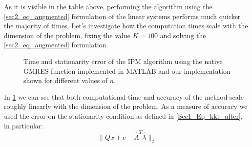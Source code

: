 As it is visible in the table above, performing the algorithm using the \ref{sec2_eq_augmented} formulation of the linear systems performs much quicker the majority of times. Let's investigate how the computation times scale with the dimension of the problem, fixing the value \(K=100\) and solving the \ref{sec2_eq_augmented} formulation.

\begin{figure}[H]
    \centering
    \caption{Time and stationarity error of the IPM algorithm using the native GMRES function implemented in MATLAB and our implementation shown for different values of \(n\).}
    \label{time_accuracy}
  \end{figure}

\noindent In \ref{time_accuracy} we can see that both computational time and accuracy of the method scale roughly linearly with the dimension of the problem. As a measure of accuracy we used the error on the stationarity condition as defined in \ref{Sec1_Eq_kkt_after}, in particular:
\[ \| Qx + c - \hat{A}^T \hat{\lambda} \| _ 2\]